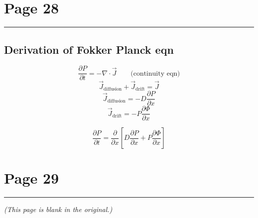 \documentclass[11pt,a4paper]{article}
\newcommand{\pagehead}[1]{%
  \clearpage
  \section*{Page #1}
  \vspace{-0.6em}
  {\color{black!45}\rule{\linewidth}{0.5pt}}
  \vspace{0.4em}
}
\begin{document}
\pagehead{28}

\subsection*{Derivation of Fokker Planck eqn}

\[
\frac{\partial P}{\partial t}=-\nabla\cdot\vec J
\qquad\text{(continuity eqn)}
\]
\[
\vec J_{\text{diffusion}}+\vec J_{\text{drift}}=\vec J
\]
\[
\vec J_{\text{diffusion}}=-D\frac{\partial P}{\partial x}
\]
\[
\vec J_{\text{drift}}=-P\frac{\partial\Phi}{\partial x}
\]
\begin{handbox}
\[
\frac{\partial P}{\partial t}
=\frac{\partial}{\partial x}
\left[D\frac{\partial P}{\partial x}+P\frac{\partial\Phi}{\partial x}\right]
\]
\end{handbox}

\pagehead{29}

\begin{center}
\emph{(This page is blank in the original.)}
\end{center}
\end{document}
